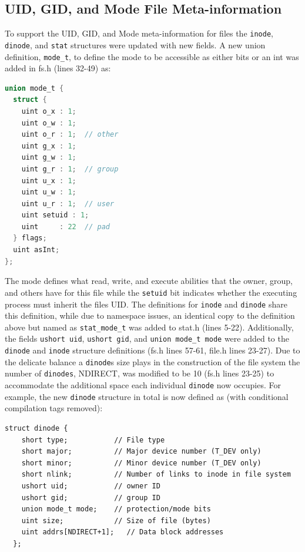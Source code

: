 \documentclass[11pt,letterpaper]{report}
\begin{document}
	\subsection*{UID, GID, and Mode File Meta-information}
	To support the UID, GID, and Mode meta-information for files the {\tt inode}, {\tt dinode}, and {\tt stat} structures were updated with new fields. A new union definition, {\tt mode\_t},
	 to define the mode to be accessible as either bits or an int was added in fs.h (lines 32-49) as:
\begin{lstlisting}[language=C]
union mode_t {
  struct {
    uint o_x : 1;
    uint o_w : 1;
    uint o_r : 1;  // other
    uint g_x : 1;
    uint g_w : 1;
    uint g_r : 1;  // group
    uint u_x : 1;
    uint u_w : 1;
    uint u_r : 1;  // user
    uint setuid : 1;
    uint     : 22  // pad
  } flags;
  uint asInt;
};
\end{lstlisting}
	 The mode defines what read, write, and execute abilities that the owner, group, and others have for this file while the {\tt setuid} bit indicates whether the executing process must inherit
	 the files UID. 
	 The definitions for {\tt inode} and {\tt dinode} share this definition, while due to namespace issues, an identical copy to the definition above but named as {\tt stat\_mode\_t} was added
	 to stat.h (lines 5-22). Additionally, the fields {\tt ushort uid}, {\tt ushort gid}, and {\tt union mode\_t mode} were added to the {\tt dinode} and {\tt inode} structure definitions 
	 (fs.h lines 57-61, file.h lines 23-27). Due to the delicate balance a {\tt dinode}s size plays in the construction of the file system the number of {\tt dinodes}, NDIRECT, was modified to be
	 10 (fs.h lines 23-25) to accommodate the additional space each individual {\tt dinode} now occupies. For example, the new {\tt dinode} structure in total is now defined as (with conditional
	 compilation tags removed):

\begin{lstlisting}	 
struct dinode {
    short type;           // File type
    short major;          // Major device number (T_DEV only)
    short minor;          // Minor device number (T_DEV only)
    short nlink;          // Number of links to inode in file system
    ushort uid;           // owner ID
    ushort gid;           // group ID
    union mode_t mode;    // protection/mode bits
    uint size;            // Size of file (bytes)
    uint addrs[NDIRECT+1];   // Data block addresses
  };
 \end{lstlisting}
 	
\end{document}
